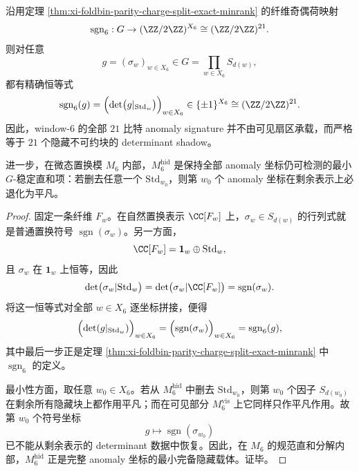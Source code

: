\begin{theorem}[异常签名等于隐藏标准块的行列式影子]\label{thm:conclusion-window6-anomaly-determinant-shadow}
沿用定理 \ref{thm:xi-foldbin-parity-charge-split-exact-minrank} 的纤维奇偶荷映射
\[
\operatorname{sgn}_6:G\to (\ZZ/2\ZZ)^{X_6}\cong (\ZZ/2\ZZ)^{21}.
\]
则对任意
\[
g=(\sigma_w)_{w\in X_6}\in G=\prod_{w\in X_6}S_{d(w)},
\]
都有精确恒等式
\[
\operatorname{sgn}_6(g)
=
\Bigl(\det\bigl(g|_{\mathrm{Std}_w}\bigr)\Bigr)_{w\in X_6}
\in
\{\pm 1\}^{X_6}\cong (\ZZ/2\ZZ)^{21}.
\]
因此，window-\(6\) 的全部 \(21\) 比特 anomaly signature 并不由可见扇区承载，而严格等于 \(21\) 个隐藏不可约块的 determinant shadow。

进一步，在微态置换模 \(M_6\) 内部，\(M_6^{\mathrm{hid}}\) 是保持全部 anomaly 坐标仍可检测的最小 \(G\)-稳定直和项：若删去任意一个 \(\mathrm{Std}_{w_0}\)，则第 \(w_0\) 个 anomaly 坐标在剩余表示上必退化为平凡。
\end{theorem}
\begin{proof}
固定一条纤维 \(F_w\)。在自然置换表示 \(\CC[F_w]\) 上，\(\sigma_w\in S_{d(w)}\) 的行列式就是普通置换符号 \(\operatorname{sgn}(\sigma_w)\)。另一方面，
\[
\CC[F_w]=\mathbf 1_w\oplus \mathrm{Std}_w,
\]
且 \(\sigma_w\) 在 \(\mathbf 1_w\) 上恒等，因此
\[
\det\bigl(\sigma_w|\mathrm{Std}_w\bigr)
=
\det\bigl(\sigma_w|\CC[F_w]\bigr)
=
\operatorname{sgn}(\sigma_w).
\]
将这一恒等式对全部 \(w\in X_6\) 逐坐标拼接，便得
\[
\Bigl(\det(g|_{\mathrm{Std}_w})\Bigr)_{w\in X_6}
=
\Bigl(\operatorname{sgn}(\sigma_w)\Bigr)_{w\in X_6}
=
\operatorname{sgn}_6(g),
\]
其中最后一步正是定理 \ref{thm:xi-foldbin-parity-charge-split-exact-minrank} 中 \(\operatorname{sgn}_6\) 的定义。

最小性方面，取任意 \(w_0\in X_6\)。若从 \(M_6^{\mathrm{hid}}\) 中删去 \(\mathrm{Std}_{w_0}\)，则第 \(w_0\) 个因子 \(S_{d(w_0)}\) 在剩余所有隐藏块上都作用平凡；而在可见部分 \(M_6^{\mathrm{vis}}\) 上它同样只作平凡作用。故第 \(w_0\) 个符号坐标
\[
g\longmapsto \operatorname{sgn}(\sigma_{w_0})
\]
已不能从剩余表示的 determinant 数据中恢复。因此，在 \(M_6\) 的规范直和分解内部，\(M_6^{\mathrm{hid}}\) 正是完整 anomaly 坐标的最小完备隐藏载体。证毕。
\end{proof}


